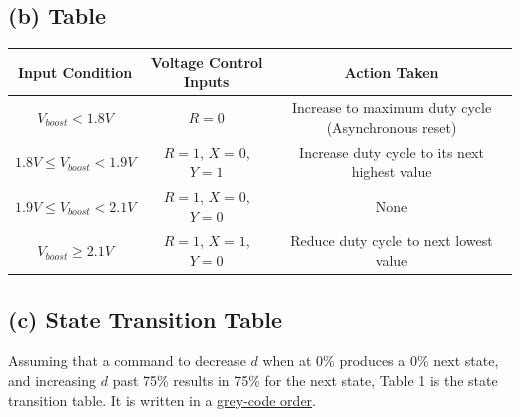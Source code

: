 \documentclass{article}
\begin{document}
\subsection*{(b) Table}

\begin{table}[!ht]
    \centering
    \setlength\extrarowheight{2pt} %
    \begin{tabularx}{\textwidth}{|C|C|C|}
    \hline
    Input Condition & Voltage Control Inputs & Action Taken  \\\hline
    $V_{boost} < 1.8V$ & $R = 0$ & Increase to maximum duty cycle (Asynchronous reset) \\
    \hline
    $1.8V \leq V_{boost} < 1.9V$ & $R = 1$, $X = 0$, $Y = 1$& Increase duty cycle to its next highest value \\
    \hline
    $1.9V \leq V_{boost} < 2.1V$ & $R = 1$, $X = 0$, $Y = 0$ & None \\
    \hline
    $ V_{boost} \geq 2.1V$ & $R = 1$, $X = 1$, $Y = 0$ & Reduce duty cycle to next lowest value \\
    \hline
    \end{tabularx}
\end{table}

\subsection*{(c) State Transition Table}
Assuming that a command to decrease $d$ when at 0\% produces a 0\% next state, and increasing $d$ past 75\% results in 75\% for the next state, Table 1 is the state transition table. It is written in a \underline{grey-code order}.
\end{document}
